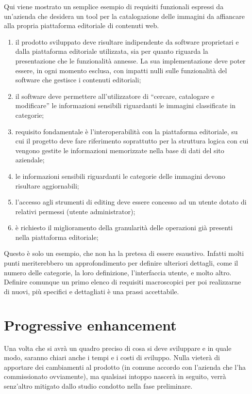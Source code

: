 Qui viene mostrato un semplice esempio di requisiti funzionali espressi da un'azienda che desidera un tool per la catalogazione delle immagini da affiancare alla propria piattaforma editoriale di contenuti web.

\begin{enumerate}
\item il prodotto sviluppato deve risultare indipendente da software proprietari e dalla piattaforma editoriale utilizzata, sia per quanto riguarda la presentazione che le funzionalità annesse. La sua implementazione deve poter essere, in ogni momento esclusa, con impatti nulli sulle funzionalità del software che gestisce i contenuti editoriali;
\item il software deve permettere all'utilizzatore di ``cercare, catalogare e modificare'' le informazioni sensibili riguardanti le immagini classificate in categorie;
\item requisito fondamentale è l'interoperabilità con la piattaforma editoriale, su cui il progetto deve fare riferimento soprattutto per la struttura logica con cui vengono gestite le informazioni memorizzate nella base di dati del sito aziendale; 
\item le informazioni sensibili riguardanti le categorie delle immagini devono risultare aggiornabili;
\item l'accesso agli strumenti di editing deve essere concesso ad un utente dotato di relativi permessi (utente administrator);
\item è richiesto il miglioramento della granularità delle operazioni già presenti nella piattaforma editoriale; 
\end{enumerate}

Questo è solo un esempio, che non ha la pretesa di essere esaustivo. Infatti molti punti meriterebbero un approfondimento per definire ulteriori dettagli, come il numero delle categorie, la loro definizione, l'interfaccia utente, e molto altro. Definire comunque un primo elenco di requisiti macroscopici per poi realizzarne di nuovi, più specifici e dettagliati è una prassi accettabile.

\section*{Progressive enhancement}
Una volta che si avrà un quadro preciso di cosa si deve sviluppare e in quale modo, saranno chiari anche i tempi e i costi di sviluppo. Nulla vieterà di apportare dei cambiamenti al prodotto (in comune accordo con l'azienda che l'ha commissionato ovviamente), ma qualsiasi intoppo nascerà in seguito, verrà senz'altro mitigato dallo studio condotto nella fase preliminare.

